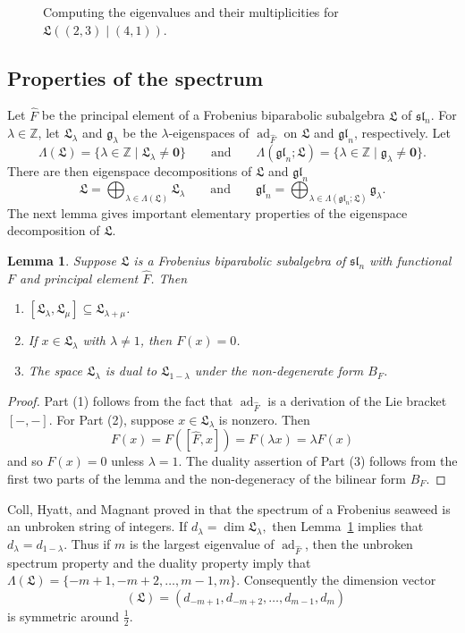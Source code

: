 \documentclass{amsart}
\newcommand{\bs}[1]{\boldsymbol{#1}}
\def\ZZ{\mathbb Z}
\def\sl{\mathfrak{sl}}
\def\gl{\mathfrak{gl}}
\def\L{\mathfrak L}
\def\Ooms{\Lambda} %
\def\hatF{\widehat{F}}
\def\sln{\sl_n}
\def\gln{\gl_n}
\def\dimvec{\mathop{\underline{\mathrm{dim}}}}
\def\ad{\operatorname{ad}}
\newtheorem{lemma}[theorem]{Lemma}
\theoremstyle{definition}
\begin{document}
\begin{figure}[!hbt]
    \centering
    
    \caption{Computing the eigenvalues and their multiplicities for
$\L((2,3)\mid (4,1))$.}
    \label{fig:eigentally}
\end{figure}
\subsection{Properties of the spectrum}
Let $\hatF$ be the principal element of a Frobenius biparabolic subalgebra $\L$ of $\sln$. For $\lambda \in \ZZ$, let $\L_\lambda$ and $\mathfrak{g}_{\lambda}$ be the $\lambda$-eigenspaces of 
$\ad_{\hatF}$ on $\L$ and $\gln$, respectively. Let 
\[\Ooms(\L) = \{\lambda\in\ZZ\mid \L_\lambda\neq\bs0\} \qquad \text{and}\qquad  \Ooms(\gln;\L) = \{\lambda\in\ZZ\mid \mathfrak{g}_\lambda\neq\bs0\}.\] 
There are then eigenspace decompositions of $\L$ and $\gln$ 
\[
\L=\bigoplus_{\lambda\in\Ooms(\L)}\L_\lambda \qquad \text{and}\qquad \gln=\bigoplus_{\lambda\in\Ooms(\gln;\L)}\mathfrak{g}_\lambda.
\]
The next lemma gives important elementary properties of the eigenspace decomposition of $\L$.
\begin{lemma}
\label{th:elementary-properties}
Suppose $\L$ is a Frobenius biparabolic subalgebra of $\sln$ with
functional $F$ and principal element $\hatF$. Then
\begin{enumerate}
\item $[\L_\lambda,\L_\mu]\subseteq \L_{\lambda+\mu}$.
\item If $x\in\L_\lambda$ with $\lambda\neq 1$, then $F(x)=0$.
\item The space $\L_\lambda$ is dual to $\L_{1-\lambda}$ under the
non-degenerate form $B_F$.
\end{enumerate}
\end{lemma}
\begin{proof}
Part (1) follows from the fact that $\ad_{\hatF}$ is a derivation of the Lie bracket $[-,-]$.
For Part (2), suppose $x\in \L_{\lambda}$ is nonzero. Then
\[F(x)=F([\hatF,x])=F(\lambda x)=\lambda F(x)\]
and so $F(x)=0$ unless $\lambda = 1$. The duality assertion of Part (3) follows  from the first two parts of the lemma and the non-degeneracy of the bilinear form $B_F$.
\end{proof}

Coll, Hyatt, and Magnant proved in \cite{coll2018unbroken} that the
spectrum of a Frobenius seaweed is an unbroken string of integers. If $d_\lambda=\dim\L_\lambda,$
then Lemma~\ref{th:elementary-properties} implies that $ d_\lambda=d_{1-\lambda}.$ Thus if $m$ is the largest eigenvalue of $\ad_{\hatF}$, then the unbroken 
spectrum property and the duality property imply that $\Ooms(\L) = \{-m+1,-m+2,\ldots,m-1,m\}$. Consequently the dimension vector
\[
\dimvec(\L)
=
(d_{-m+1},d_{-m+2},\ldots,d_{m-1},d_m)
\]
is symmetric around $\frac12$. 
\end{document}
